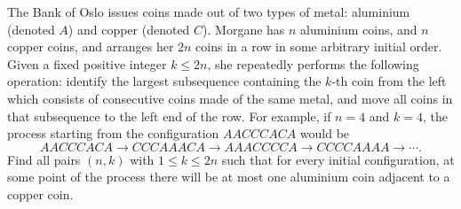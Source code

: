 The Bank of Oslo issues coins made out of two types of metal: aluminium (denoted $A$) and copper (denoted $C$). Morgane has $n$ aluminium coins, and $n$ copper coins, and arranges her $2n$ coins in a row in some arbitrary initial order. Given a fixed positive integer $k \leq 2n$, she repeatedly performs the following operation: identify the largest subsequence containing the $k$-th coin from the left which consists of consecutive coins made of the same metal, and move all coins in that subsequence to the left end of the row. For example, if $n = 4$ and $k = 4$, the process starting from the configuration $AACCCACA$ would be
\[ AACCCACA \to CCCAAACA \to AAACCCCA \to CCCCAAAA \to \cdots. \]
Find all pairs $(n,k)$ with $1 \leq k \leq 2n$ such that for every initial configuration, at some point of the process there will be at most one aluminium coin adjacent to a copper coin.
